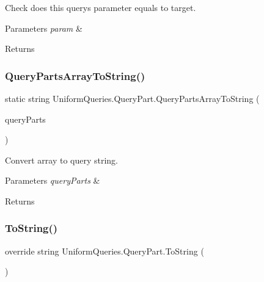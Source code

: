 Check does this query\textquotesingle{}s parameter equals to target. 


\begin{DoxyParams}{Parameters}
{\em param} & \\
\hline
\end{DoxyParams}
\begin{DoxyReturn}{Returns}

\end{DoxyReturn}
\mbox{\label{struct_uniform_queries_1_1_query_part_a053c8ba08ddd1a20d5b50128a524da09}} 
\subsubsection{\texorpdfstring{Query\+Parts\+Array\+To\+String()}{QueryPartsArrayToString()}}
{\footnotesize\ttfamily static string Uniform\+Queries.\+Query\+Part.\+Query\+Parts\+Array\+To\+String (\begin{DoxyParamCaption}\item[{\mbox{\hyperlink{struct_uniform_queries_1_1_query_part}{Query\+Part}} \mbox{[}$\,$\mbox{]}}]{query\+Parts }\end{DoxyParamCaption})\hspace{0.3cm}{\ttfamily [static]}}



Convert array to query string. 


\begin{DoxyParams}{Parameters}
{\em query\+Parts} & \\
\hline
\end{DoxyParams}
\begin{DoxyReturn}{Returns}

\end{DoxyReturn}
\mbox{\label{struct_uniform_queries_1_1_query_part_acf5597530f693df3804fc2e638805245}} 
\subsubsection{\texorpdfstring{To\+String()}{ToString()}}
{\footnotesize\ttfamily override string Uniform\+Queries.\+Query\+Part.\+To\+String (\begin{DoxyParamCaption}{ }\end{DoxyParamCaption})}



